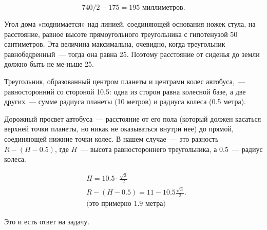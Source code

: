 ﻿
\begin{itemize}

\itA $$740/2-175 = 195\text{\ миллиметров.}$$

\itB Угол дома «поднимается» над линией, соединяющей основания ножек стула, на расстояние, равное высоте прямоугольного треугольника с гипотенузой 50 сантиметров. Эта величина максимальна, очевидно, когда треугольник равнобедренный~— тогда она равна \SI{25}{}. Поэтому расстояние от сиденья до земли должно быть не ме-\linebreak ньше \SI{25}{}.

\begin{center}  \end{center}

\itC Треугольник, образованный центром планеты и центрами колес автобуса,~— равносторонний со стороной \SI{10.5}{}: одна из сторон равна колесной базе, а две других~— сумме радиуса планеты (10 метров) и радиуса колеса (0.5 метра).

\begin{center}
\end{center}

Дорожный просвет автобуса~— расстояние от его пола (который должен касаться верхней точки планеты, но никак не оказываться внутри нее) до прямой, соединяющей нижние точки колес. В нашем случае~— это разность $R-(H-0.5)$, где $H$~— высота равностороннего треугольника, а $0.5$~— радиус колеса.

\begin{align*}
	& H = 10.5 \cdot \frac{\sqrt{3}}{2} \\
	& R-(H-0.5) = 11 - 10.5\frac{\sqrt{3}}{2}. \\
	& \text{(это примерно 1.9 метра)}
\end{align*}

Это и есть ответ на задачу.
\end{itemize}